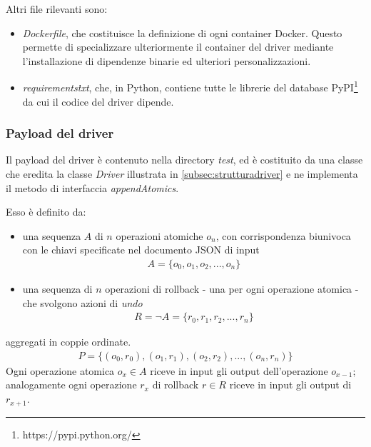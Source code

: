 \documentclass[../main.tex]{subfiles}
\begin{document}
Altri file rilevanti sono:
\begin{itemize}
    \item \textit{Dockerfile}, che costituisce la definizione di ogni container Docker. Questo permette di specializzare ulteriormente il container del driver mediante l'installazione di dipendenze binarie ed ulteriori personalizzazioni.
    \item \textit{requirements\.txt}, che, in Python, contiene tutte le librerie del database PyPI\footnote{https://pypi.python.org/} da cui il codice del driver dipende.
\end{itemize}


\subsubsection{Payload del driver}

\label{subsec:payload}
Il payload del driver è contenuto nella directory \textit{test}, ed è costituito da una classe che eredita la classe \textit{Driver} illustrata in \ref{subsec:strutturadriver} e ne implementa il metodo di interfaccia \textit{appendAtomics}.

Esso è definito da:
\begin{itemize}
\item una sequenza $A$ di $n$ operazioni atomiche $o_n$, con corrispondenza biunivoca con le chiavi specificate nel documento JSON di input
\begin{align*}
A = \{ o_0, o_1, o_2, ... , o_n \}
\end{align*}
\item una sequenza di $n$ operazioni di rollback - una per ogni operazione atomica - che svolgono azioni di \textit{undo}
\begin{align*}
R = \lnot A = \{ r_0, r_1, r_2, ... , r_n \}
\end{align*}
\end{itemize}
aggregati in coppie ordinate.
\begin{align*}
P = \{ (o_0, r_0), (o_1, r_1) , (o_2, r_2) , ... , (o_n, r_n)\}
\end{align*}
Ogni operazione atomica $o_x \in A$ riceve in input gli output dell'operazione $o_{x-1}$; analogamente ogni operazione $r_x$ di rollback $r \in R$ riceve in input gli output di $r_{x+1}$.
\end{document}
